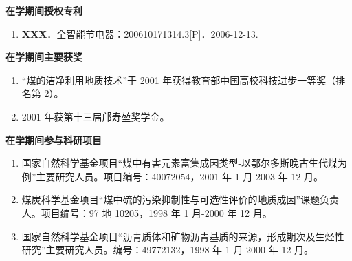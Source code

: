 \vspace{1\baselineskip}
\begingroup
    \centering
    \heiti\bfseries 在学期间授权专利
    \par
    \vspace{\baselineskip}
\endgroup
\begin{enumerate}[label=\arabic*., leftmargin=2em, itemsep=0pt, parsep=0pt]
    \songti
    \item \textbf{XXX}．全智能节电器：200610171314.3[P]．2006-12-13.
\end{enumerate}

\clearpage

\begingroup
    \centering
    \heiti\bfseries 在学期间主要获奖
    \par
    \vspace{\baselineskip}
\endgroup
\begin{enumerate}[label=\arabic*., leftmargin=2em, itemsep=0pt, parsep=0pt]
    \songti
    \item “煤的洁净利用地质技术”于 2001 年获得教育部中国高校科技进步一等奖（排名第 2）。
    \item 2001 年获第十三届邝寿堃奖学金。
\end{enumerate}

\vspace{1\baselineskip}
\begingroup
    \centering
    \heiti\bfseries 在学期间参与科研项目
    \par
    \vspace{\baselineskip}
\endgroup
\begin{enumerate}[label=\arabic*., leftmargin=2em, itemsep=0pt, parsep=0pt]
    \songti
    \item 国家自然科学基金项目“煤中有害元素富集成因类型-以鄂尔多斯晚古生代煤为例”主要研究人员。项目编号：40072054，2001 年 1 月-2003 年 12 月。
    \item 煤炭科学基金项目“煤中硫的污染抑制性与可选性评价的地质成因”课题负责人。项目编号：97 地 10205，1998 年 1 月-2000 年 12 月。
    \item 国家自然科学基金项目“沥青质体和矿物沥青基质的来源，形成期次及生烃性研究”主要研究人员。编号：49772132，1998 年 1 月-2000 年 12 月。
\end{enumerate}
